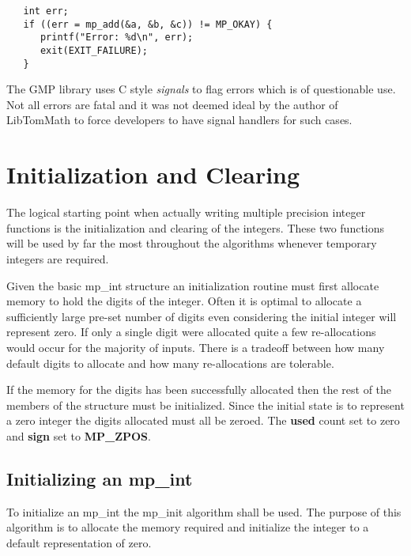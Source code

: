 \documentclass[b5paper]{book}
\begin{document}
\begin{verbatim}
   int err;
   if ((err = mp_add(&a, &b, &c)) != MP_OKAY) {
      printf("Error: %d\n", err);
      exit(EXIT_FAILURE);
   }
\end{verbatim}

The GMP library uses C style \textit{signals} to flag errors which is of questionable use.  Not all errors are fatal 
and it was not deemed ideal by the author of LibTomMath to force developers to have signal handlers for such cases.

\section{Initialization and Clearing}
The logical starting point when actually writing multiple precision integer functions is the initialization and 
clearing of the integers.  These two functions will be used by far the most throughout the algorithms whenever 
temporary integers are required.

Given the basic mp\_int structure an initialization routine must first allocate memory to hold the digits of
the integer.  Often it is optimal to allocate a sufficiently large pre-set number of digits even considering
the initial integer will represent zero.  If only a single digit were allocated quite a few re-allocations
would occur for the majority of inputs.  There is a tradeoff between how many default digits to allocate
and how many re-allocations are tolerable.  

If the memory for the digits has been successfully allocated then the rest of the members of the structure must
be initialized.  Since the initial state is to represent a zero integer the digits allocated must all be zeroed.  The
\textbf{used} count set to zero and \textbf{sign} set to \textbf{MP\_ZPOS}.

\subsection{Initializing an mp\_int}
To initialize an mp\_int the mp\_init algorithm shall be used.  The purpose of this algorithm is to allocate 
the memory required and initialize the integer to a default representation of zero.
\end{document}
